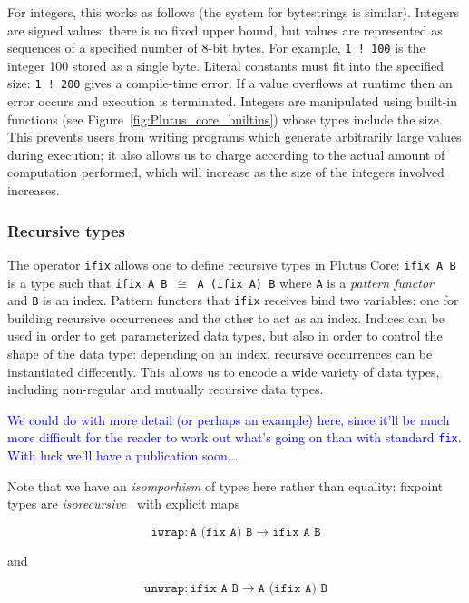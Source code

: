 \documentclass[a4paper]{article}
\newcommand{\blue}[1]{\textcolor{blue}{#1}}
\begin{document}
For integers, this works as follows (the system for 
bytestrings is similar).  Integers are signed values:
there is no fixed upper bound, but values are represented as sequences
of a specified number of 8-bit bytes.  For example, \texttt{1~!~100}
is the integer 100 stored as a single byte.  Literal constants must
fit into the specified size: \texttt{1~!~200} gives a compile-time
error. If a value overflows at runtime then an error occurs and
execution is terminated.  Integers are manipulated using built-in
functions (see Figure~\ref{fig:Plutus_core_builtins}) whose types
include the size. This prevents users from writing programs which
generate arbitrarily large values during execution; it also allows us
to charge according to the actual amount of computation performed,
which will increase as the size of the integers involved increases.


\subsubsection{Recursive types}
\label{sec:ifix-note}
\noindent
The operator \texttt{ifix} allows one to define recursive types in
Plutus Core: \texttt{ifix A B} is a type such that \texttt{ifix A B
  $\cong$ A (ifix A) B} where \texttt{A} is a \textit{pattern
  functor}~\cite[2.4]{backhouseetal98} and \texttt{B} is an
index. Pattern functors that \texttt{ifix} receives bind two variables:
one for building recursive occurrences and the other to act as an
index. Indices can be used in order to get parameterized data types,
but also in order to control the shape of the data type: depending on
an index, recursive occurrences can be instantiated differently.  This
allows us to encode a wide variety of data types, including non-regular and
mutually recursive data types.

\blue{We could do with more detail (or perhaps an example) here, since
  it'll be much more difficult for the reader to work out what's going
  on than with standard \texttt{fix}.  With luck we'll have a publication
  soon...}

Note that we have an \textit{isomporhism} of types here
rather than equality: fixpoint types are
\textit{isorecursive}~\cite[20.2]{Pierce:TAPL} with explicit maps

$$
\texttt{iwrap} : \texttt{A (fix A) B} \rightarrow \texttt{ifix A B}
$$

\noindent and

$$
\texttt{unwrap} : \texttt{ifix A B} \rightarrow  \texttt{A (ifix A) B}
$$
\end{document}
